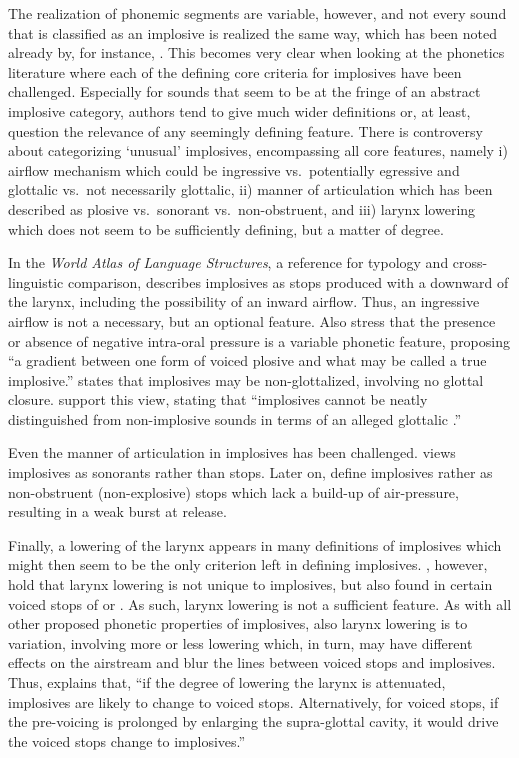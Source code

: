\documentclass[output=paper]{LSP/langsci}
\begin{document}
The realization of phonemic segments are variable, however, and not every sound that is classified as an implosive is realized the same way, which has been noted already by, for instance, \citet{Greenberg1970}. This becomes very clear when looking at the phonetics literature where each of the defining core criteria for implosives have been challenged. Especially for sounds that seem to be at the fringe of an abstract implosive category, authors tend to give much wider definitions or, at least, question the relevance of any seemingly defining feature.  There is controversy about categorizing `unusual' implosives, encompassing all core features, namely i) airflow mechanism which could be ingressive vs.\ potentially egressive and glottalic vs.\ not necessarily glottalic, ii) manner of articulation which has been described as plosive vs.\ sonorant vs.\ non-obstruent, and iii) larynx lowering which does not seem to be sufficiently defining, but a matter of degree.

In the {\it World Atlas of Language Structures}, a reference for typology and cross-linguistic comparison,  \citet{Maddieson2013} describes implosives as stops produced with a downward  of the larynx, including the possibility of an inward airflow. Thus, an ingressive airflow is not a necessary, but an optional feature. Also \citet[82]{Ladefoged1996} stress that the presence or absence of negative intra-oral pressure is a variable phonetic feature, proposing ``a gradient between one form of voiced plosive and what may be called a true implosive.''
\citet{Lindau1984} states that implosives may be non-glottalized, involving no glottal closure. \citet[56]{Clements2008} support this view, stating that ``implosives cannot be neatly distinguished from non-implosive sounds in terms of an alleged glottalic .''

Even the manner of articulation in implosives has been challenged. \citet{Clements2000} views implosives as sonorants rather than stops. Later on, \citet{Clements2002} define implosives rather as non-obstruent (non-explosive) stops which lack a build-up of air-pressure, resulting in a weak burst at release.

Finally, a lowering of the larynx appears in many definitions of implosives which might then seem to be the only criterion left in defining implosives. \citet{Ewan1974}, however, hold that larynx lowering is not unique to implosives, but also found in certain voiced stops of  or . As such, larynx lowering is not a sufficient feature. As with all other proposed phonetic properties of implosives, also larynx lowering is  to variation, involving more or less lowering which, in turn, may have different effects on the airstream and blur the lines between voiced stops and implosives. Thus, \citet[11]{Xi2009} explains that, ``if  the  degree  of  lowering  the  larynx  is  attenuated,  implosives  are  likely to  change  to
  voiced  stops.  Alternatively,  for  voiced  stops,  if  the  pre-voicing  is  prolonged  by  enlarging  the  supra-glottal  cavity,  it  would  drive  the  voiced  stops  change  to  implosives.''
\end{document}
